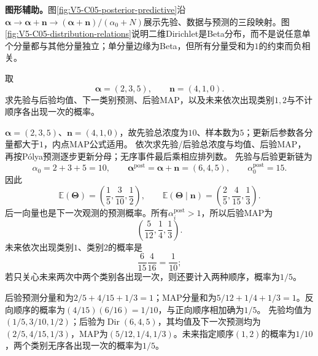 \label{struct:V5-C05-CH17}
\textbf{图形辅助。}图\ref{fig:V5-C05-posterior-predictive}沿
$\boldsymbol\alpha\to\boldsymbol\alpha+\boldsymbol n\to
(\boldsymbol\alpha+\boldsymbol n)/(\alpha_0+N)$展示先验、数据与预测的三段映射。图\ref{fig:V5-C05-distribution-relations}说明二维Dirichlet是Beta分布，而不是说任意单个分量都与其他分量独立；单分量边缘为Beta，但所有分量受和为$1$的约束而负相关。


\label{struct:V5-C05-CH18}
\begin{example}\label{exm:V5-C05-three-category}
取
\[
\boldsymbol\alpha=(2,3,5),\qquad
\boldsymbol n=(4,1,0).
\]
求先验与后验均值、下一类别预测、后验MAP，以及未来依次出现类别$1,2$与不计顺序各出现一次的概率。
\end{example}

\begin{solution}
\SolGiven $\boldsymbol\alpha=(2,3,5)$、$\boldsymbol n=(4,1,0)$，故先验总浓度为$10$、样本数为$5$；更新后参数各分量都大于$1$，内点MAP公式适用。
\SolPlan 依次求先验/后验总浓度与均值、后验MAP，再按Pólya预测逐步更新分母；无序事件最后乘相应排列数。
\SolDerive 先验与后验更新链为
\[
\alpha_0=2+3+5=10,\qquad
\boldsymbol\alpha^{\mathrm{post}}
=\boldsymbol\alpha+\boldsymbol n=(6,4,5),\qquad
\alpha_0^{\mathrm{post}}=15.
\]
因此
\[
\mathbb E(\boldsymbol\Theta)
=\left(\frac15,\frac3{10},\frac12\right),
\qquad
\mathbb E(\boldsymbol\Theta\mid\boldsymbol n)
=\left(\frac25,\frac4{15},\frac13\right).
\]
后一向量也是下一次观测的预测概率。所有$\alpha_i^{\mathrm{post}}>1$，所以后验MAP为
\[
\left(\frac5{12},\frac14,\frac13\right).
\]
未来依次出现类别$1$、类别$2$的概率是
\[
\frac6{15}\frac4{16}=\frac1{10};
\]
若只关心未来两次中两个类别各出现一次，则还要计入两种顺序，概率为$1/5$。

\SolCheck 后验预测分量和为$2/5+4/15+1/3=1$；MAP分量和为$5/12+1/4+1/3=1$。反向顺序的概率为$(4/15)(6/16)=1/10$，与正向顺序相加确为$1/5$。
\SolAnswer 先验均值为$(1/5,3/10,1/2)$；后验为$\operatorname{Dir}(6,4,5)$，其均值及下一次预测均为$(2/5,4/15,1/3)$，MAP为$(5/12,1/4,1/3)$。未来指定顺序$(1,2)$的概率为$1/10$，两个类别无序各出现一次的概率为$1/5$。
\end{solution}


